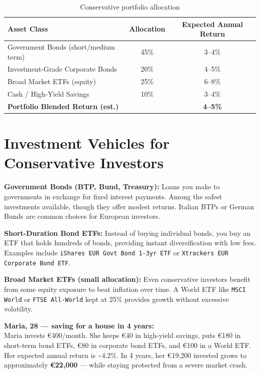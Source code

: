 \documentclass[12pt, a4paper]{book}
\begin{document}
\begin{table}[h!]
\centering
\begin{tabular}{lcc}
\toprule
\textbf{Asset Class} & \textbf{Allocation} & \textbf{Expected Annual Return} \\
\midrule
Government Bonds (short/medium term) & 45\% & 3--4\% \\
Investment-Grade Corporate Bonds & 20\% & 4--5\% \\
Broad Market ETFs (equity) & 25\% & 6--8\% \\
Cash / High-Yield Savings & 10\% & 3--4\% \\
\midrule
\textbf{Portfolio Blended Return (est.)} & & \textbf{4--5\%} \\
\bottomrule
\end{tabular}
\caption{Conservative portfolio allocation}
\end{table}

\section{Investment Vehicles for Conservative Investors}

\textbf{Government Bonds (BTP, Bund, Treasury):} Loans you make to governments in exchange for fixed interest payments. Among the safest investments available, though they offer modest returns. Italian BTPs or German Bunds are common choices for European investors.

\textbf{Short-Duration Bond ETFs:} Instead of buying individual bonds, you buy an ETF that holds hundreds of bonds, providing instant diversification with low fees. Examples include \texttt{iShares EUR Govt Bond 1-3yr ETF} or \texttt{Xtrackers EUR Corporate Bond ETF}.

\textbf{Broad Market ETFs (small allocation):} Even conservative investors benefit from some equity exposure to beat inflation over time. A World ETF like \texttt{MSCI World} or \texttt{FTSE All-World} kept at 25\% provides growth without excessive volatility.

\begin{examplebox}
\textbf{Maria, 28 --- saving for a house in 4 years:}\\
Maria invests \euro{}400/month. She keeps \euro{}40 in high-yield savings, puts \euro{}180 in short-term bond ETFs, \euro{}80 in corporate bond ETFs, and \euro{}100 in a World ETF. Her expected annual return is \textasciitilde{}4.2\%. In 4 years, her \euro{}19{,}200 invested grows to approximately \textbf{\euro{}22{,}000} --- while staying protected from a severe market crash.
\end{examplebox}
\end{document}
